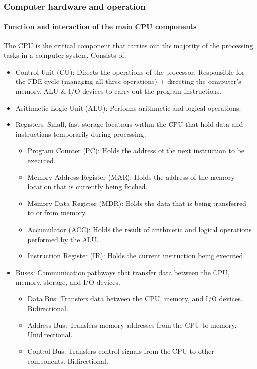 \subsubsection{Computer hardware and operation}
\paragraph{Function and interaction of the main CPU components}
The CPU is the critical component that carries out the majority of the processing tasks in a computer system. Consists of:
\begin{itemize}
    \item Control Unit (CU): Directs the operations of the processor. Responsible for the FDE cycle (managing all three operations) + directing the computer's memory, ALU \& I/O devices to carry out the program instructions.
    \item Arithmetic Logic Unit (ALU): Performs arithmetic and logical operations.
    \item Registers: Small, fast storage locations within the CPU that hold data and instructions temporarily during processing.
    \begin{itemize}
        \item Program Counter (PC): Holds the address of the next instruction to be executed.
        \item Memory Address Register (MAR): Holds the address of the memory location that is currently being fetched.
        \item Memory Data Register (MDR): Holds the data that is being transferred to or from memory.
        \item Accumulator (ACC): Holds the result of arithmetic and logical operations performed by the ALU.
        \item Instruction Register (IR): Holds the current instruction being executed.
    \end{itemize}
    \item Buses: Communication pathways that transfer data between the CPU, memory, storage, and I/O devices.
    \begin{itemize}
        \item Data Bus: Transfers data between the CPU, memory, and I/O devices. Bidirectional.
        \item Address Bus: Transfers memory addresses from the CPU to memory. Unidirectional.
        \item Control Bus: Transfers control signals from the CPU to other components. Bidirectional.
    \end{itemize}
\end{itemize}
